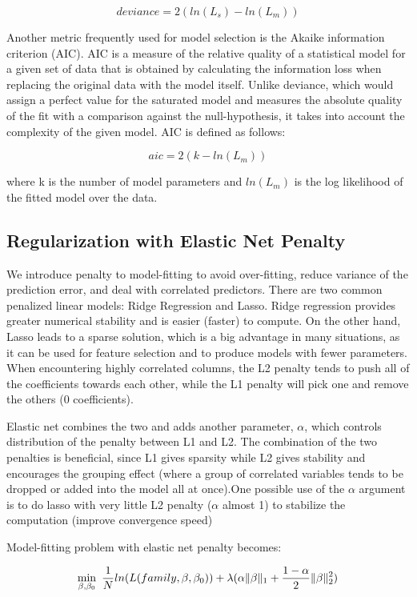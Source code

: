 \documentclass[11pt]{article}
\begin{document}
\[ deviance = 2({ln(L_{s})} - {ln(L_{m})}) \]

Another metric frequently used for model selection is the Akaike information criterion (AIC). AIC is a measure of the relative quality of a statistical model for a given set of data that is obtained by calculating the information loss when replacing the original data with the model itself. Unlike deviance, which would assign a perfect value for the saturated model and measures the absolute quality of the fit with a comparison against the null-hypothesis, it takes into account the complexity of the given model. AIC is defined as follows:

\[ aic = 2(k - ln(L_{m}))\]

\noindent
where k is the number of model parameters and $ln(L_{m})$ is the log likelihood of the fitted model over the data.

\subsection{Regularization with Elastic Net Penalty} 
We introduce penalty to model-fitting to avoid over-fitting, reduce variance of the prediction error, and deal with correlated predictors. There are two common penalized linear models: Ridge Regression and Lasso. Ridge regression provides greater numerical stability and is easier (faster) to compute. On the other hand, Lasso leads to a sparse solution, which is a big advantage in many situations, as it can be used for feature selection and to produce models with fewer parameters. When encountering highly correlated columns, the L2 penalty tends to push all of the coefficients towards each other, while the L1 penalty will pick one and remove the others (0 coefficients).

Elastic net combines the two and adds another parameter, $\alpha$, which controls distribution of the penalty between L1 and L2. The combination of the two penalties is beneficial, since L1 gives sparsity while L2 gives stability and encourages the grouping effect (where a group of correlated variables tends to be dropped or added into the model all at once).One possible use of the $\alpha$ argument is to do lasso with very little L2 penalty ($\alpha$ almost 1) to stabilize the computation (improve convergence speed)

Model-fitting problem with elastic net penalty becomes:

\[ \min\limits_{\beta,\beta_0}\ {{1\over{N}} ln(L(family,\beta,\beta_0))  + \lambda (\alpha \| \beta \|_1}  + {1- \alpha \over 2} \| \beta \|_2^2) \]
\end{document}
